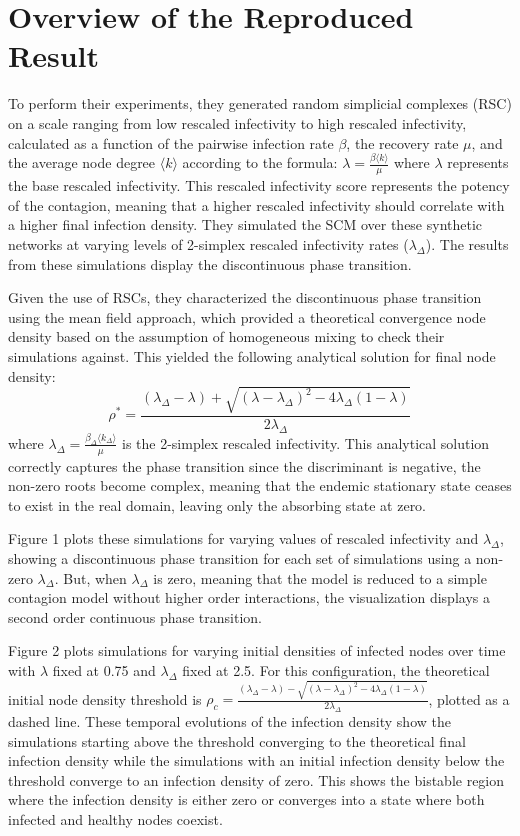 \documentclass[12pt]{article}
\begin{document}
\section{Overview of the Reproduced Result}
To perform their experiments, they generated random simplicial complexes (RSC) on a scale ranging from low rescaled infectivity to high rescaled infectivity, calculated as a function of the pairwise infection rate $\beta$, the recovery rate $\mu$, and the average node degree $\langle k \rangle$ according to the formula: $\lambda = \frac{\beta \langle k \rangle}{\mu}$ where $\lambda$ represents the base rescaled infectivity. This rescaled infectivity score represents the potency of the contagion, meaning that a higher rescaled infectivity should correlate with a higher final infection density. They simulated the SCM over these synthetic networks at varying levels of 2-simplex rescaled infectivity rates ($\lambda_{\Delta}$). The results from these simulations display the discontinuous phase transition.

Given the use of RSCs, they characterized the discontinuous phase transition using the mean field approach, which provided a theoretical convergence node density based on the assumption of homogeneous mixing to check their simulations against. This yielded the following analytical solution for final node density: 
\begin{equation}
\rho^* = \frac{(\lambda_{\Delta} - \lambda) + \sqrt{(\lambda - \lambda_{\Delta})^2 - 4\lambda_{\Delta}(1-\lambda)}}{2\lambda_{\Delta}}
\label{eq:rho_star}
\end{equation}
where $\lambda_{\Delta} = \frac{\beta_{\Delta} \langle k_{\Delta} \rangle}{\mu}$ is the 2-simplex rescaled infectivity. This analytical solution correctly captures the phase transition since the discriminant is negative, the non-zero roots become complex, meaning that the endemic stationary state ceases to exist in the real domain, leaving only the absorbing state at zero.

Figure 1 plots these simulations for varying values of rescaled infectivity and $\lambda_{\Delta}$, showing a discontinuous phase transition for each set of simulations using a non-zero $\lambda_{\Delta}$. But, when $\lambda_{\Delta}$ is zero, meaning that the model is reduced to a simple contagion model without higher order interactions, the visualization displays a second order continuous phase transition.

Figure 2 plots simulations for varying initial densities of infected nodes over time with $\lambda$ fixed at 0.75 and $\lambda_{\Delta}$ fixed at 2.5. For this configuration, the theoretical initial node density threshold is $\rho_c = \frac{(\lambda_{\Delta} - \lambda) - \sqrt{(\lambda - \lambda_{\Delta})^2 - 4\lambda_{\Delta}(1-\lambda)}}{2\lambda_{\Delta}}$, plotted as a dashed line. These temporal evolutions of the infection density show the simulations starting above the threshold converging to the theoretical final infection density while the simulations with an initial infection density below the threshold converge to an infection density of zero. This shows the bistable region where the infection density is either zero or converges into a state where both infected and healthy nodes coexist.
\end{document}
